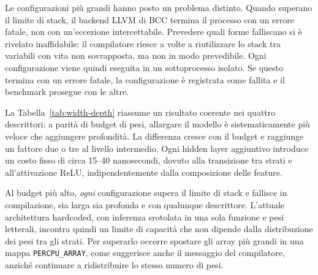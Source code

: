 \documentclass[binding=0.6cm,italian,oneside,noexaminfo]{sapthesis}
\begin{document}
Le configurazioni più grandi hanno posto un problema distinto. Quando superano il limite di stack, il backend LLVM di BCC termina il processo con un errore fatale, non con un'eccezione intercettabile. Prevedere quali forme falliscano si è rivelato inaffidabile: il compilatore riesce a volte a riutilizzare lo stack tra variabili con vita non sovrapposta, ma non in modo prevedibile. Ogni configurazione viene quindi eseguita in un sottoprocesso isolato. Se questo termina con un errore fatale, la configurazione è registrata come fallita e il benchmark prosegue con le altre.

\begin{table}[h]
\centering
\caption{Larghezza contro profondità a parità di budget di pesi (minimo su 15 trial, descrittore storico).}
\label{tab:width-depth}
\end{table}

La Tabella~\ref{tab:width-depth} riassume un risultato coerente nei quattro descrittori: a parità di budget di pesi, allargare il modello è sistematicamente più veloce che aggiungere profondità. La differenza cresce con il budget e raggiunge un fattore due o tre al livello intermedio. Ogni hidden layer aggiuntivo introduce un costo fisso di circa 15--40 nanosecondi, dovuto alla transizione tra strati e all'attivazione ReLU, indipendentemente dalla composizione delle feature.

Al budget più alto, \emph{ogni} configurazione supera il limite di stack e fallisce in compilazione, sia larga sia profonda e con qualunque descrittore. L'attuale architettura hardcoded, con inferenza srotolata in una sola funzione e pesi letterali, incontra quindi un limite di capacità che non dipende dalla distribuzione dei pesi tra gli strati. Per superarlo occorre spostare gli array più grandi in una mappa \texttt{PERCPU\_ARRAY}, come suggerisce anche il messaggio del compilatore, anziché continuare a ridistribuire lo stesso numero di pesi.
\end{document}
